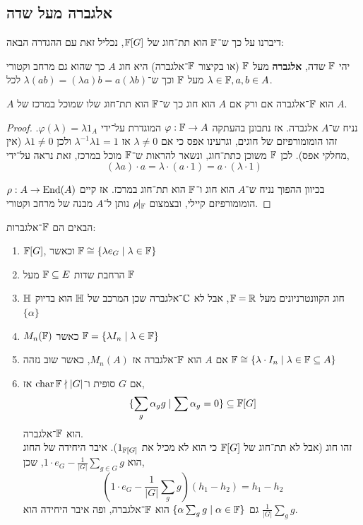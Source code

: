 \subsection{אלגברה מעל שדה}
דיברנו על כך ש־$\mathbb{F}$ הוא תת־חוג של $\mathbb{F}[G]$, נכליל זאת עם ההגדרה הבאה:
\begin{definition}[אלגברה]
	יהי $\mathbb{F}$ שדה, \textbf{אלגברה} מעל $\mathbb{F}$ (או בקיצור $\mathbb{F}$־אלגברה) היא חוג $A$ כך שהוא גם מרחב וקטורי מעל $\mathbb{F}$ וכך ש־$\lambda (a b) = (\lambda a) b = a (\lambda b)$ לכל $\lambda \in \mathbb{F}, a, b \in A$.
\end{definition}
\begin{proposition}
	$A$ הוא $\mathbb{F}$־אלגברה אם ורק אם $A$ הוא חוג כך ש־$\mathbb{F}$ הוא תת־חוג שלו שמוכל במרכז של $A$.
\end{proposition}
\begin{proof}
	נניח ש־$A$ אלגברה.
	אז נתבונן בהעתקה $\varphi : \mathbb{F} \to A$ המוגדרת על־ידי $\varphi(\lambda) = \lambda 1_A$.
	זהו הומומורפיזם של חוגים, וגרעינו אפס כי אם $\lambda \ne 0$ אז $\lambda^{-1} \lambda 1 = 1$ ולכן $\lambda 1 \ne 0$ (אין מחלקי אפס).
	לכן $\mathbb{F}$ משוכן כתת־חוג, ונשאר להראות ש־$\mathbb{F}$ מוכל במרכז, זאת נראה על־ידי,
	\[
		(\lambda a) \cdot a
		= \lambda \cdot (a \cdot 1)
		= a \cdot (\lambda \cdot 1)
	\]

	בכיוון ההפוך נניח ש־$A$ הוא חוג ו־$\mathbb{F}$ הוא תת־חוג במרכז.
	אז קיים $\rho : A \to \operatorname{End}(A)$ הומומורפיזם קיילי, ובצמצום $\rho |_{\mathbb{F}}$ נותן ל־$A$ מבנה של מרחב וקטורי.
\end{proof}
\begin{example}
	הבאים הם $\mathbb{F}$־אלגברות:
	\begin{enumerate}
		\item $\mathbb{F}[G]$, וכאשר $\mathbb{F} \cong \{ \lambda e_G \mid \lambda \in \mathbb{F} \}$
		\item הרחבת שדות $\mathbb{F} \subseteq E$ מעל $\mathbb{F}$
		\item $\mathbb{H}$ חוג הקוונטרניונים מעל $\mathbb{F} = \mathbb{R}$, אבל לא $\mathbb{C}$־אלגברה שכן המרכב של $\mathbb{H}$ הוא בדיוק $\{ \alpha \}$
		\item $M_n(\mathbb{F})$ כאשר $\mathbb{F} = \{ \lambda I_n \mid \lambda \in \mathbb{F} \}$
		\item אם $A$ הוא $\mathbb{F}$־אלגברה אז $M_n(A)$, כאשר שוב נזהה $\mathbb{F} \cong \{ \lambda \cdot I_n \mid \lambda \in \mathbb{F} \subseteq A \}$
		\item אם $G$ סופית ו־$\operatorname{char} \mathbb{F} \nmid |G|$ אז,
			\[
				\{ \sum_g \alpha_g g \mid \sum \alpha_g = 0 \}
				\subseteq \mathbb{F}[G]
			\]
			הוא $\mathbb{F}$־אלגברה. \\
			זהו חוג (אבל לא תת־חוג של $\mathbb{F}[G]$ כי הוא לא מכיל את $1_{\mathbb{F}[G]}$).
			איבר היחידה של החוג הוא $1 \cdot e_G - \frac{1}{|G|} \sum_{g \in G} g$, שכן,
			\[
				(1 \cdot e_G - \frac{1}{|G|} \sum_g  g)(h_1 - h_2)
				= h_1 - h_2
			\]
			גם $\{ \alpha \sum_g g \mid \alpha \in \mathbb{F} \}$ הוא $\mathbb{F}$־אלגברה, ופה איבר היחידה הוא $\frac{1}{|G|} \sum_g g$.
	\end{enumerate}
\end{example}
